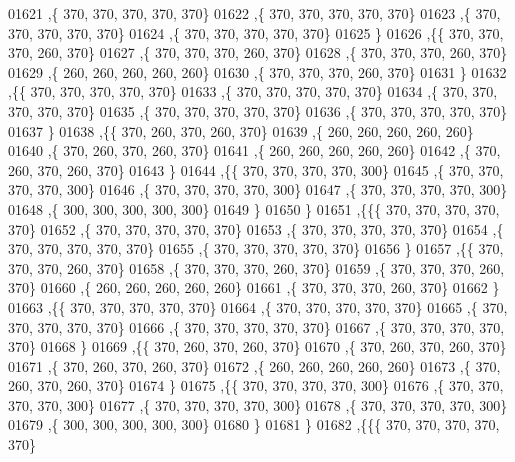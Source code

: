 \begin{DoxyCode}
01621    ,\{   370,   370,   370,   370,   370\}
01622    ,\{   370,   370,   370,   370,   370\}
01623    ,\{   370,   370,   370,   370,   370\}
01624    ,\{   370,   370,   370,   370,   370\}
01625    \}
01626   ,\{\{   370,   370,   370,   260,   370\}
01627    ,\{   370,   370,   370,   260,   370\}
01628    ,\{   370,   370,   370,   260,   370\}
01629    ,\{   260,   260,   260,   260,   260\}
01630    ,\{   370,   370,   370,   260,   370\}
01631    \}
01632   ,\{\{   370,   370,   370,   370,   370\}
01633    ,\{   370,   370,   370,   370,   370\}
01634    ,\{   370,   370,   370,   370,   370\}
01635    ,\{   370,   370,   370,   370,   370\}
01636    ,\{   370,   370,   370,   370,   370\}
01637    \}
01638   ,\{\{   370,   260,   370,   260,   370\}
01639    ,\{   260,   260,   260,   260,   260\}
01640    ,\{   370,   260,   370,   260,   370\}
01641    ,\{   260,   260,   260,   260,   260\}
01642    ,\{   370,   260,   370,   260,   370\}
01643    \}
01644   ,\{\{   370,   370,   370,   370,   300\}
01645    ,\{   370,   370,   370,   370,   300\}
01646    ,\{   370,   370,   370,   370,   300\}
01647    ,\{   370,   370,   370,   370,   300\}
01648    ,\{   300,   300,   300,   300,   300\}
01649    \}
01650   \}
01651  ,\{\{\{   370,   370,   370,   370,   370\}
01652    ,\{   370,   370,   370,   370,   370\}
01653    ,\{   370,   370,   370,   370,   370\}
01654    ,\{   370,   370,   370,   370,   370\}
01655    ,\{   370,   370,   370,   370,   370\}
01656    \}
01657   ,\{\{   370,   370,   370,   260,   370\}
01658    ,\{   370,   370,   370,   260,   370\}
01659    ,\{   370,   370,   370,   260,   370\}
01660    ,\{   260,   260,   260,   260,   260\}
01661    ,\{   370,   370,   370,   260,   370\}
01662    \}
01663   ,\{\{   370,   370,   370,   370,   370\}
01664    ,\{   370,   370,   370,   370,   370\}
01665    ,\{   370,   370,   370,   370,   370\}
01666    ,\{   370,   370,   370,   370,   370\}
01667    ,\{   370,   370,   370,   370,   370\}
01668    \}
01669   ,\{\{   370,   260,   370,   260,   370\}
01670    ,\{   370,   260,   370,   260,   370\}
01671    ,\{   370,   260,   370,   260,   370\}
01672    ,\{   260,   260,   260,   260,   260\}
01673    ,\{   370,   260,   370,   260,   370\}
01674    \}
01675   ,\{\{   370,   370,   370,   370,   300\}
01676    ,\{   370,   370,   370,   370,   300\}
01677    ,\{   370,   370,   370,   370,   300\}
01678    ,\{   370,   370,   370,   370,   300\}
01679    ,\{   300,   300,   300,   300,   300\}
01680    \}
01681   \}
01682  ,\{\{\{   370,   370,   370,   370,   370\}

\end{DoxyCode}
